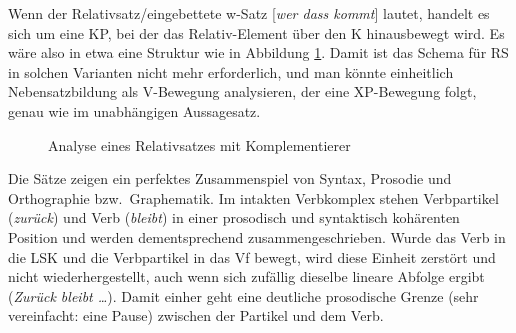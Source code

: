 
Wenn der Relativsatz\slash eingebettete w-Satz [\textit{wer dass kommt}] lautet, handelt es sich um eine KP, bei der das Relativ-Element über den K hinausbewegt wird.
Es wäre also in etwa eine Struktur wie in Abbildung \ref{fig:relativsatzzmitkomp}.
Damit ist das Schema für RS in solchen Varianten nicht mehr erforderlich, und man könnte einheitlich Nebensatzbildung als V-Bewegung analysieren, der eine XP-Bewegung folgt, genau wie im unabhängigen Aussagesatz.

\begin{figure}[!htbp]
  \begin{center}
  \end{center}
  \caption{Analyse eines Relativsatzes mit Komplementierer}
  \label{fig:relativsatzzmitkomp}
\end{figure}


Die Sätze zeigen ein perfektes Zusammenspiel von Syntax, Prosodie und Orthographie bzw.\ Graphematik.
Im intakten Verbkomplex stehen Verbpartikel (\textit{zurück}) und Verb (\textit{bleibt}) in einer prosodisch und syntaktisch kohärenten Position und werden dementsprechend zusammengeschrieben.
Wurde das Verb in die LSK und die Verbpartikel in das Vf bewegt, wird diese Einheit zerstört und nicht wiederhergestellt, auch wenn sich zufällig dieselbe lineare Abfolge ergibt (\textit{Zurück bleibt \ldots}).
Damit einher geht eine deutliche prosodische Grenze (sehr vereinfacht: eine Pause) zwischen der Partikel und dem Verb.



